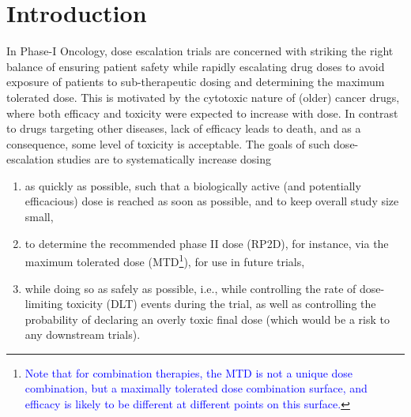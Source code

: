 \documentclass[AMA,STIX1COL]{WileyNJD-v2}
\newcommand{\revision}[1]{\textcolor{blue}{#1}}
\begin{document}


\maketitle

\newpage
\section{Introduction}\label{sec1}
In Phase-I Oncology, dose escalation trials are concerned with striking the right balance of ensuring patient safety while rapidly escalating drug doses to avoid exposure of patients to sub-therapeutic dosing and determining the maximum tolerated dose\cite{LeTourneau2009}. This is motivated by the cytotoxic nature of (older) cancer drugs, where both efficacy and toxicity were expected to increase with dose. In contrast to drugs targeting other diseases, lack of efficacy leads to death, and as a consequence, some level of toxicity is acceptable. 
The goals of such dose-escalation studies are to systematically increase dosing
\begin{enumerate}
\item as quickly as possible, such that a biologically active (and potentially efficacious) dose is reached as soon as possible, and to keep overall study size small,
\item to determine the recommended phase II dose (RP2D), for instance, via the maximum tolerated dose (MTD\footnote{\revision{Note that for combination therapies, the MTD is not a unique dose combination, but a maximally tolerated dose combination surface, and efficacy is likely to be different at different points on this surface.}}), for use in future trials\cite{Neuenschwander2014},
\item while doing so as safely as possible, i.e., while controlling the rate of dose-limiting toxicity (DLT) events during the trial, as well as controlling the probability of declaring an overly toxic final dose (which would be a risk to any downstream trials).
\end{enumerate}
\end{document}
